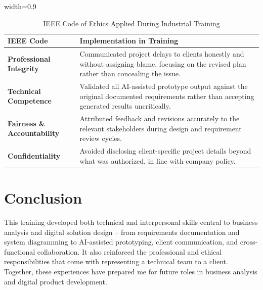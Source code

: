 \begin{table}[H]
\centering
\caption{IEEE Code of Ethics Applied During Industrial Training}
\begin{adjustbox}{width=0.9\textwidth}
\begin{tabular}{|l|p{10cm}|}
\hline
\textbf{IEEE Code} & \textbf{Implementation in Training} \\ \hline
\textbf{Professional Integrity} & Communicated project delays to clients honestly and without assigning blame, focusing on the revised plan rather than concealing the issue. \\ \hline
\textbf{Technical Competence} & Validated all AI-assisted prototype output against the original documented requirements rather than accepting generated results uncritically. \\ \hline
\textbf{Fairness \& Accountability} & Attributed feedback and revisions accurately to the relevant stakeholders during design and requirement review cycles. \\ \hline
\textbf{Confidentiality} & Avoided disclosing client-specific project details beyond what was authorized, in line with company policy. \\ \hline
\end{tabular}
\end{adjustbox}
\label{tab:ieee-ethics-mapping}
\end{table}

\section{Conclusion}
\par This training developed both technical and interpersonal skills central to business analysis and digital solution design -- from requirements documentation and system diagramming to AI-assisted prototyping, client communication, and cross-functional collaboration. It also reinforced the professional and ethical responsibilities that come with representing a technical team to a client. Together, these experiences have prepared me for future roles in business analysis and digital product development.

